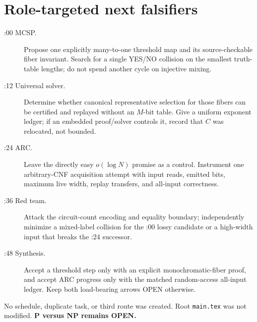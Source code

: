 \documentclass[11pt]{article}
\begin{document}
\section*{Role-targeted next falsifiers}
\begin{description}
\item[:00 MCSP.] Propose one explicitly many-to-one threshold map and its
source-checkable fiber invariant.  Search for a single YES/NO collision on the
smallest truth-table lengths; do not spend another cycle on injective mixing.
\item[:12 Universal solver.] Determine whether canonical representative
selection for those fibers can be certified and replayed without an $M$-bit
table.  Give a uniform exponent ledger; if an embedded proof/solver controls
it, record that $C$ was relocated, not bounded.
\item[:24 ARC.] Leave the directly easy $o(\log N)$ promise as a control.
Instrument one arbitrary-CNF acquisition attempt with input reads, emitted
bits, maximum live width, replay transfers, and all-input correctness.
\item[:36 Red team.] Attack the circuit-count encoding and equality boundary;
independently minimize a mixed-label collision for the :00 lossy candidate or
a high-width input that breaks the :24 successor.
\item[:48 Synthesis.] Accept a threshold step only with an explicit
monochromatic-fiber proof, and accept ARC progress only with the matched
random-access all-input ledger.  Keep both load-bearing arrows OPEN otherwise.
\end{description}

No schedule, duplicate task, or third route was created.  Root
\texttt{main.tex} was not modified.  \textbf{P versus NP remains OPEN.}

\end{document}
